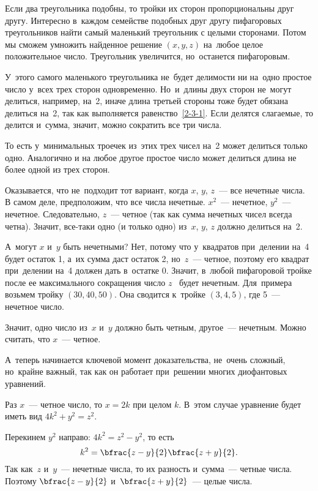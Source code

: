 Если два треугольника подобны, то тройки их сторон пропорциональны друг другу. Интересно
в~каждом семействе подобных друг другу пифагоровых треугольников найти самый маленький
треугольник с целыми сторонами. Потом мы сможем умножить найденное решение $(x,y,z)$
на~любое целое положительное число.
 Треугольник увеличится, но~останется пифагоровым.

У~этого самого маленького треугольника не~будет делимости ни на~одно простое число у~всех трех
сторон одновременно. Но~и~длины двух сторон не~могут делиться, например, на~2, иначе длина третьей
стороны тоже будет обязана делиться на~2, так как выполняется равенство~\eqref{2-3-1}. Если делятся
слагаемые, то делится и~сумма, значит, можно сократить все три числа.


То есть у~минимальных троечек из~этих трех чисел на~2 может делиться только одно.
Аналогично и на любое другое простое число может делиться длина не более одной из трех сторон.

Оказывается, что не~подходит тот вариант, когда $x$, $y$, $z$~--- все нечетные числа.
В самом деле, предположим, что все числа нечетные. $x^{2}$~--- нечетное, $y^{2}$~---
нечетное. Следовательно, $z$~--- четное (так как сумма нечетных чисел всегда четна).
Значит, все-таки одно (и только одно) из~$x$, $y$, $z$ должно делиться на~2.


А~могут $x$ и~$y$ быть нечетными? Нет, потому что у~квадратов при~делении на~4 будет остаток 1, а~их
сумма даст остаток 2, но~$z$~--- четное, поэтому его квадрат при~делении на~4 должен дать в~остатке 0.
Значит, в~любой пифагоровой тройке после ее максимального сокращения число $z$~ будет нечетным. Для~примера
возьмем тройку $(30, 40, 50)$. Она сводится к~тройке $(3, 4, 5)$, где 5~--- нечетное число.

\pagebreak

Значит, одно число из~$x$ и~$y$ должно быть четным, другое~--- нечетным. Можно считать, что $x$~--- четное.

А~теперь начинается ключевой момент доказательства, не~очень сложный, но~крайне важный, так как он
работает при~решении многих диофантовых уравнений.

Раз $x$~--- четное число, то $x=2k$ при целом $k$. В~этом случае уравнение будет иметь вид $4k^{2}+y^{2}=z^{2}$.

Перекинем $y^{2}$ направо: $4k^{2}=z^{2}-y^{2}$, то есть
$$
k^{2}=\bfrac{z-y}{2}\bfrac{z+y}{2}.
$$
Так как~$z$ и~$y$~--- нечетные числа, то их разность и~сумма~--- четные числа.
Поэтому $\bfrac{z-y}{2}$ и~$\bfrac{z+y}{2}$~--- целые числа.

